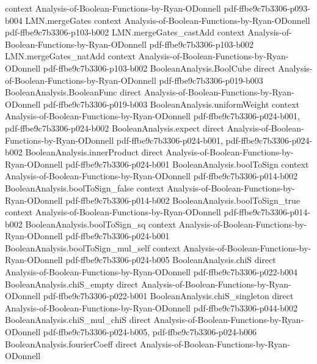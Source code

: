 \begin{theorem}
  {context}
  {Analysis-of-Boolean-Functions-by-Ryan-ODonnell}
  {pdf-ffbe9c7b3306-p093-b004}
\proofstep
  {LMN.mergeGates}
  {context}
  {Analysis-of-Boolean-Functions-by-Ryan-ODonnell}
  {pdf-ffbe9c7b3306-p103-b002}
\proofstep
  {LMN.mergeGates_castAdd}
  {context}
  {Analysis-of-Boolean-Functions-by-Ryan-ODonnell}
  {pdf-ffbe9c7b3306-p103-b002}
\proofstep
  {LMN.mergeGates_natAdd}
  {context}
  {Analysis-of-Boolean-Functions-by-Ryan-ODonnell}
  {pdf-ffbe9c7b3306-p103-b002}
\proofstep
  {BooleanAnalysis.BoolCube}
  {direct}
  {Analysis-of-Boolean-Functions-by-Ryan-ODonnell}
  {pdf-ffbe9c7b3306-p019-b003}
\proofstep
  {BooleanAnalysis.BooleanFunc}
  {direct}
  {Analysis-of-Boolean-Functions-by-Ryan-ODonnell}
  {pdf-ffbe9c7b3306-p019-b003}
\proofstep
  {BooleanAnalysis.uniformWeight}
  {context}
  {Analysis-of-Boolean-Functions-by-Ryan-ODonnell}
  {pdf-ffbe9c7b3306-p024-b001,
    pdf-ffbe9c7b3306-p024-b002}
\proofstep
  {BooleanAnalysis.expect}
  {direct}
  {Analysis-of-Boolean-Functions-by-Ryan-ODonnell}
  {pdf-ffbe9c7b3306-p024-b001,
    pdf-ffbe9c7b3306-p024-b002}
\proofstep
  {BooleanAnalysis.innerProduct}
  {direct}
  {Analysis-of-Boolean-Functions-by-Ryan-ODonnell}
  {pdf-ffbe9c7b3306-p024-b001}
\proofstep
  {BooleanAnalysis.boolToSign}
  {context}
  {Analysis-of-Boolean-Functions-by-Ryan-ODonnell}
  {pdf-ffbe9c7b3306-p014-b002}
\proofstep
  {BooleanAnalysis.boolToSign_false}
  {context}
  {Analysis-of-Boolean-Functions-by-Ryan-ODonnell}
  {pdf-ffbe9c7b3306-p014-b002}
\proofstep
  {BooleanAnalysis.boolToSign_true}
  {context}
  {Analysis-of-Boolean-Functions-by-Ryan-ODonnell}
  {pdf-ffbe9c7b3306-p014-b002}
\proofstep
  {BooleanAnalysis.boolToSign_sq}
  {context}
  {Analysis-of-Boolean-Functions-by-Ryan-ODonnell}
  {pdf-ffbe9c7b3306-p024-b001}
\proofstep
  {BooleanAnalysis.boolToSign_mul_self}
  {context}
  {Analysis-of-Boolean-Functions-by-Ryan-ODonnell}
  {pdf-ffbe9c7b3306-p024-b005}
\proofstep
  {BooleanAnalysis.chiS}
  {direct}
  {Analysis-of-Boolean-Functions-by-Ryan-ODonnell}
  {pdf-ffbe9c7b3306-p022-b004}
\proofstep
  {BooleanAnalysis.chiS_empty}
  {direct}
  {Analysis-of-Boolean-Functions-by-Ryan-ODonnell}
  {pdf-ffbe9c7b3306-p022-b001}
\proofstep
  {BooleanAnalysis.chiS_singleton}
  {direct}
  {Analysis-of-Boolean-Functions-by-Ryan-ODonnell}
  {pdf-ffbe9c7b3306-p044-b002}
\proofstep
  {BooleanAnalysis.chiS_mul_chiS}
  {direct}
  {Analysis-of-Boolean-Functions-by-Ryan-ODonnell}
  {pdf-ffbe9c7b3306-p024-b005,
    pdf-ffbe9c7b3306-p024-b006}
\proofstep
  {BooleanAnalysis.fourierCoeff}
  {direct}
  {Analysis-of-Boolean-Functions-by-Ryan-ODonnell}

\end{theorem}
